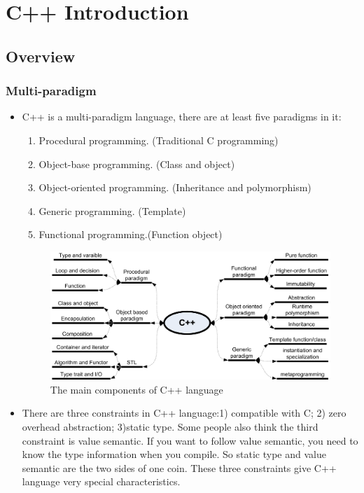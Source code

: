 \documentclass[a4paper,11pt,twoside]{book}
\begin{document}
\chapter{C++ Introduction}

\section{Overview}
\subsection{Multi-paradigm}
\begin{itemize}
	\item C++ is a multi-paradigm language, there are at least five paradigms in it: 
	\begin{enumerate}
		\item Procedural programming. (Traditional C programming)
		\item Object-base programming. (Class and object)
		\item Object-oriented programming. (Inheritance and polymorphism)
		\item Generic programming. (Template)
		\item Functional programming.(Function object)
	\end{enumerate}
	
	\begin{figure}[h]
		\centering
		\includegraphics[width=0.95\linewidth]{pics/whole.png}
		\caption{The main components of C++ language}
		\label{fig:whole}
	\end{figure}

    \item There are three constraints in C++ language:1) compatible with C; 2) zero overhead abstraction; 3)static type. Some people also think the third constraint is value semantic. If you want to follow value semantic, you need to know the type information when you compile. So static type and value semantic are the two sides of one coin. These three constraints give C++ language very special characteristics. 
\end{itemize}
\end{document}
